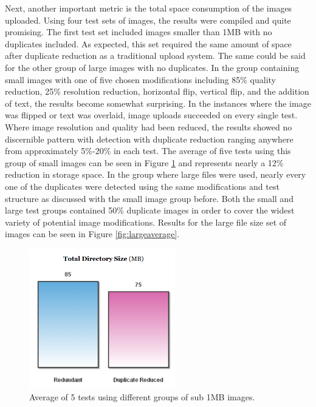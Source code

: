 Next, another important metric is the total space consumption of the images uploaded. Using four test sets of images, the results were compiled and quite promising. The first test set included images smaller than 1MB with no duplicates included. As expected, this set required the same amount of space after duplicate reduction as a traditional upload system. The same could be said for the other group of large images with no duplicates. In the group containing small images with one of five chosen modifications including 85\% quality reduction, 25\% resolution reduction, horizontal flip, vertical flip, and the addition of text, the results become somewhat surprising. In the instances where the image was flipped or text was overlaid, image uploads succeeded on every single test. Where image resolution and quality had been reduced, the results showed no discernible pattern with detection with duplicate reduction ranging anywhere from approximately 5\%-20\% in each test. The average of five tests using this group of small images can be seen in Figure \ref{fig:smallaverage} and represents nearly a 12\% reduction in storage space. In the group where large files were used, nearly every one of the duplicates were detected using the same modifications and test structure as discussed with the small image group before. Both the small and large test groups contained 50\% duplicate images in order to cover the widest variety of potential image modifications. Results for the large file size set of images can be seen in Figure \ref{fig:largeaverage}.

\begin{figure}[htbp]
\centering
\includegraphics[width=2.5in]{smallaverage}
\caption{Average of 5 tests using different groups of sub 1MB images.}
\label{fig:smallaverage}
\end{figure}

